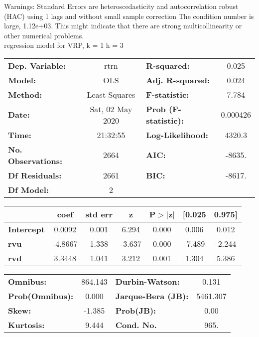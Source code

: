 Warnings: \newline
 [1] Standard Errors are heteroscedasticity and autocorrelation robust (HAC) using 1 lags and without small sample correction \newline
 [2] The condition number is large, 1.12e+03. This might indicate that there are \newline
 strong multicollinearity or other numerical problems.\\ 

regression model for VRP, k = 1 h = 3\begin{center}
\begin{tabular}{lclc}
\toprule
\textbf{Dep. Variable:}    &       rtrn       & \textbf{  R-squared:         } &     0.025   \\
\textbf{Model:}            &       OLS        & \textbf{  Adj. R-squared:    } &     0.024   \\
\textbf{Method:}           &  Least Squares   & \textbf{  F-statistic:       } &     7.784   \\
\textbf{Date:}             & Sat, 02 May 2020 & \textbf{  Prob (F-statistic):} &  0.000426   \\
\textbf{Time:}             &     21:32:55     & \textbf{  Log-Likelihood:    } &    4320.3   \\
\textbf{No. Observations:} &        2664      & \textbf{  AIC:               } &    -8635.   \\
\textbf{Df Residuals:}     &        2661      & \textbf{  BIC:               } &    -8617.   \\
\textbf{Df Model:}         &           2      & \textbf{                     } &             \\
\bottomrule
\end{tabular}
\begin{tabular}{lcccccc}
                   & \textbf{coef} & \textbf{std err} & \textbf{z} & \textbf{P$> |$z$|$} & \textbf{[0.025} & \textbf{0.975]}  \\
\midrule
\textbf{Intercept} &       0.0092  &        0.001     &     6.294  &         0.000        &        0.006    &        0.012     \\
\textbf{rvu}       &      -4.8667  &        1.338     &    -3.637  &         0.000        &       -7.489    &       -2.244     \\
\textbf{rvd}       &       3.3448  &        1.041     &     3.212  &         0.001        &        1.304    &        5.386     \\
\bottomrule
\end{tabular}
\begin{tabular}{lclc}
\textbf{Omnibus:}       & 864.143 & \textbf{  Durbin-Watson:     } &    0.131  \\
\textbf{Prob(Omnibus):} &   0.000 & \textbf{  Jarque-Bera (JB):  } & 5461.307  \\
\textbf{Skew:}          &  -1.385 & \textbf{  Prob(JB):          } &     0.00  \\
\textbf{Kurtosis:}      &   9.444 & \textbf{  Cond. No.          } &     965.  \\
\bottomrule
\end{tabular}
\end{center}

